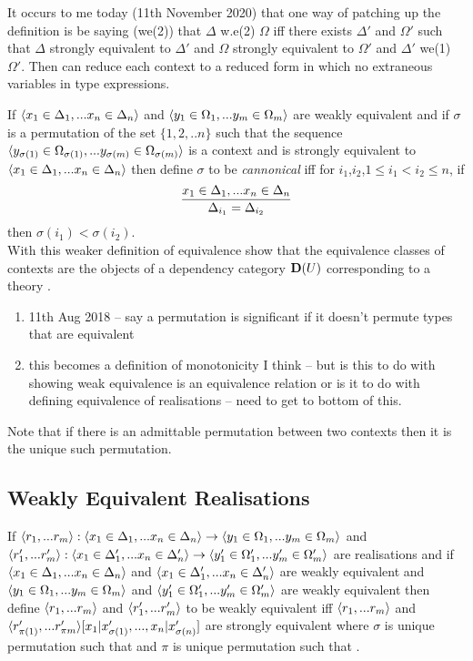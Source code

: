 \documentclass[10pt,a4paper]{scrartcl}
\begin{document}
\begin{framed}
It occurs to me today (11th November 2020) that one way of patching up the definition is be saying (we(2))
that $\Delta$ w.e(2) $\Omega$ iff there exists $\Delta'$ and $\Omega'$ such that $\Delta$ strongly equivalent to $\Delta'$
and $\Omega$ strongly equivalent to $\Omega'$ and $\Delta'$ we(1) $\Omega'$. Then can reduce each context to a reduced form in which 
no extraneous variables in type expressions.
\end{framed}
\noindent 
If $\langle x_1 \in \Delta_1,... x_{n} \in \Delta_{n}\rangle$ 
and $\langle y_1 \in \Omega_1,... y_{m} \in \Omega_{m}\rangle$ are weakly equivalent 
and if $\sigma$ is a permutation of the set $\{1,2,..n\}$
such that the sequence 
$\langle y_{\sigma(1)} \in \Omega_{\sigma(1)},... y_{\sigma(m)} \in \Omega_{\sigma(m)}\rangle$
is a context and 
is strongly equivalent to $\langle x_1 \in \Delta_1,... x_{n} \in \Delta_{n}\rangle$
then define $\sigma$ to be \textit{cannonical} iff
for $i_1$,$i_2$,$1 \leq i_1  < i_2 \leq n$, if 
$$
\frac{x_1 \in \Delta_1,... x_{n} \in \Delta_{n}}{\Delta_{i_1}=\Delta_{i_2}}
$$
then $\sigma(i_1) < \sigma(i_2)$.\\

With this weaker definition of equivalence   show that the 
equivalence classes of contexts are the objects of a dependency category
$\mathbf{D}(U)$ corresponding to a theory \gat. \\
\begin{framed}
\begin{enumerate}
\item 11th Aug 2018 -- say a permutation is significant if it doesn't permute types that are equivalent
\item this becomes a definition of monotonicity I think -- but is this to do with showing weak equivalence 
is an equivalence relation or is it to do with defining equivalence of realisations -- need to get to bottom of this.
\end{enumerate}
\end{framed}
\noindent
Note that if there is an admittable  permutation between two contexts then it is the unique such permutation. 

\subsection{Weakly Equivalent Realisations}
If $\langle r_1,...r_m\rangle: \langle x_1 \in \Delta_1,... x_{n} \in \Delta_{n}\rangle \rightarrow \langle y_1 \in \Omega_1,... y_{m} \in \Omega_{m}\rangle$ and
$\langle r'_1,...r'_m\rangle: \langle x_1 \in \Delta'_1,... x_{n} \in \Delta'_{n}\rangle \rightarrow \langle y'_1 \in \Omega'_1,... y'_{m} \in \Omega'_{m}\rangle$ are realisations 
and if $\langle x_1 \in \Delta_1,... x_{n} \in \Delta_{n}\rangle$ and 
$\langle x_1 \in \Delta'_1,... x_{n} \in \Delta'_{n}\rangle$ are weakly equivalent and 
$\langle y_1 \in \Omega_1,... y_{m} \in \Omega_{m}\rangle$ and $\langle y'_1 \in \Omega'_1,... y'_{m} \in \Omega'_{m}\rangle$ are weakly equivalent then
define $\langle r_1,...r_m\rangle$ and $\langle r'_1,...r'_m\rangle$ to be weakly equivalent 
iff 
$\langle r_1,...r_m\rangle$
and
$\langle r'_{\pi(1)},...r'_{\pi{m}}\rangle[x_1|x'_{\sigma(1)},...,x_n|x'_{\sigma(n)}]$
are strongly equivalent
where
$\sigma$ is unique permutation such that 
and $\pi$ is unique permutation such that .
\end{document}
